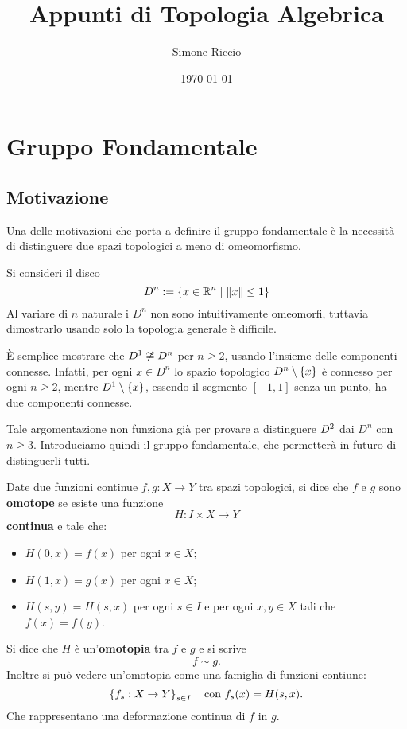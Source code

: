 \documentclass[]{article}
\begin{document}
\title{Appunti di Topologia Algebrica}
\author{Simone Riccio}
\date{\today}

\maketitle

\tableofcontents

\section{Gruppo Fondamentale}
\subsection{Motivazione}
    Una delle motivazioni che porta a definire il gruppo fondamentale è la necessità di distinguere
    due spazi topologici a meno di omeomorfismo.

    \begin{example} \nl
        Si consideri il disco 
        \[  
            D^n := \left\{  x \in \mathbb{R}^{n} \mid \left\| x \right\| \leq 1  \right\}
        \]
        Al variare di $n$ naturale i $D^n$ non sono intuitivamente omeomorfi, tuttavia dimostrarlo
        usando solo la topologia generale è difficile.

        È semplice mostrare che $D^{1} \not\cong D^n$ per $n \geq 2$, usando l'insieme delle componenti 
        connesse. Infatti, per ogni $x \in D^n$ lo spazio topologico $D^n \setminus \left\{ x \right\}$ è connesso 
        per ogni $n \geq 2$, mentre $D^{1} \setminus \left\{ x \right\}$, essendo il segmento $[-1,1]$ senza un punto, ha due componenti connesse.
    
        Tale argomentazione non funziona già per provare a distinguere $D^{2}$ dai $D^n$ con $n \geq 3$.
        Introduciamo quindi il gruppo fondamentale, che permetterà in futuro di distinguerli tutti.
    \end{example}

    \begin{definition}[Omotopia] \nl
        Date due funzioni continue $f,g: X \to Y$ tra spazi topologici, si dice che $f$ e $g$ sono \textbf{omotope} se esiste una funzione
        \[
            H: I \times X \to Y
        \]
        \textbf{continua} e tale che:
        \begin{itemize}
            \item $H(0,x) = f(x)$ per ogni $x \in X$;
            \item $H(1,x) = g(x)$ per ogni $x \in X$;
            \item $H(s,y) = H(s,x)$ per ogni $s \in I$ e per ogni $x,y \in X$ tali che $f(x) = f(y)$.
        \end{itemize}
        Si dice che $H$ è un'\textbf{omotopia} tra $f$ e $g$ e si scrive
        \[
            f \sim g.
        \]
        Inoltre si pu\`o vedere un'omotopia come una famiglia di funzioni contiune:
        \[
            \left\{ f_s: X \to Y \right\}_{s \in I}
            \quad \text{con } f_s(x) = H(s,x).
        \]
        Che rappresentano una deformazione continua di $f$ in $g$.
    \end{definition}
\end{document}
